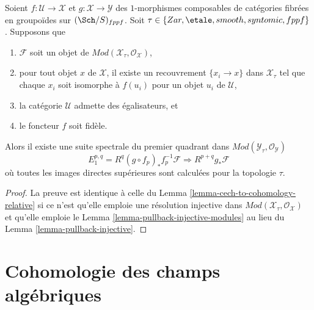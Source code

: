 \begin{lemma}
\label{lemma-cech-to-cohomology-relative-modules}
Soient $f : \mathcal{U} \to \mathcal{X}$ et
$g : \mathcal{X} \to \mathcal{Y}$
des $1$-morphismes composables de catégories fibrées
en groupoïdes sur $(\Sch/S)_{fppf}$. Soit
$\tau \in \{Zar, \etale, smooth, syntomic, \linebreak[0] fppf\}$.
Supposons que
\begin{enumerate}
\item $\mathcal{F}$ soit un objet de
$\textit{Mod}(\mathcal{X}_\tau, \mathcal{O}_\mathcal{X})$,
\item pour tout objet $x$ de $\mathcal{X}$, il existe un recouvrement
$\{x_i \to x\}$ dans $\mathcal{X}_\tau$ tel que chaque $x_i$ soit isomorphe
à $f(u_i)$ pour un objet $u_i$ de $\mathcal{U}$,
\item la catégorie $\mathcal{U}$ admette des égalisateurs, et
\item le foncteur $f$ soit fidèle.
\end{enumerate}
Alors il existe une suite spectrale du premier quadrant dans
$\textit{Mod}(\mathcal{Y}_\tau, \mathcal{O}_\mathcal{Y})$
$$
E_1^{p, q} = R^q(g \circ f_p)_*f_p^{-1}\mathcal{F}
\Rightarrow
R^{p + q}g_*\mathcal{F}
$$
où toutes les images directes supérieures sont calculées pour la topologie $\tau$.
\end{lemma}

\begin{proof}
La preuve est identique à celle du
Lemma \ref{lemma-cech-to-cohomology-relative}
si ce n'est qu'elle emploie une résolution injective dans
$\textit{Mod}(\mathcal{X}_\tau, \mathcal{O}_\mathcal{X})$
et qu'elle emploie le
Lemma \ref{lemma-pullback-injective-modules}
au lieu du
Lemma \ref{lemma-pullback-injective}.
\end{proof}






\section{Cohomologie des champs algébriques}
\label{section-cohomology}

